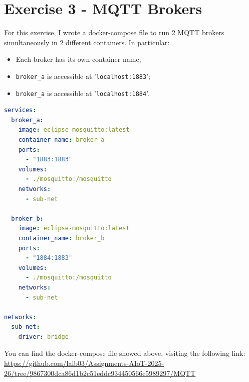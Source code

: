\section{Exercise 3 - MQTT Brokers}

For this exercise, I wrote a docker-compose file to run 2 MQTT brokers simultaneously in 2 different containers. In particular:
\begin{itemize}
    \item Each broker has its own container name;
    \item \texttt{broker\_a} is accessible at '\texttt{localhost:1883}';
    \item \texttt{broker\_a} is accessible at '\texttt{localhost:1884}'. 
\end{itemize}


\begin{lstlisting}[language=yaml]
services:
  broker_a:
    image: eclipse-mosquitto:latest
    container_name: broker_a
    ports:
      - "1883:1883"
    volumes:
      - ./mosquitto:/mosquitto
    networks:
      - sub-net

  broker_b:
    image: eclipse-mosquitto:latest
    container_name: broker_b
    ports:
      - "1884:1883"
    volumes:
      - ./mosquitto:/mosquitto
    networks:
      - sub-net

networks:
  sub-net:
    driver: bridge
\end{lstlisting}

You can find the docker-compose file showed above, visiting the following link: \url{https://github.com/lalb03/Assignments-AIoT-2025-26/tree/9867300dca86d1b2c51eddc934450566e5989297/MQTT}